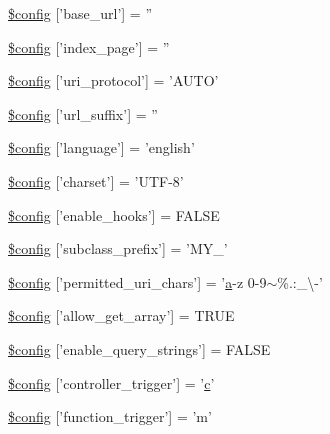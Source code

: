 \begin{DoxyCompactItemize}
\item 
\hyperlink{application_2config_2config_8php_a8063081991a9d7087e6aea78db95a524}{\$config} \mbox{[}'base\-\_\-url'\mbox{]} = ''
\item 
\hyperlink{application_2config_2config_8php_a64d47dc21f6eab24bf747cae9da5e7bb}{\$config} \mbox{[}'index\-\_\-page'\mbox{]} = ''
\item 
\hyperlink{application_2config_2config_8php_a37a0ed82a5db3c3aebdc12611e1e4498}{\$config} \mbox{[}'uri\-\_\-protocol'\mbox{]} = 'A\-U\-T\-O'
\item 
\hyperlink{application_2config_2config_8php_a40da61bb27389d4c21a1271840ec7c40}{\$config} \mbox{[}'url\-\_\-suffix'\mbox{]} = ''
\item 
\hyperlink{application_2config_2config_8php_ae05e29ba794fe4453013dd7b1cc30219}{\$config} \mbox{[}'language'\mbox{]} = 'english'
\item 
\hyperlink{application_2config_2config_8php_ac9128ac0276b1b7acf4c96a22b2469f1}{\$config} \mbox{[}'charset'\mbox{]} = 'U\-T\-F-\/8'
\item 
\hyperlink{application_2config_2config_8php_a2d80c3b160b2bb6f3329a9b07e970c51}{\$config} \mbox{[}'enable\-\_\-hooks'\mbox{]} = F\-A\-L\-S\-E
\item 
\hyperlink{application_2config_2config_8php_a51b79c9e455d64cb54212f2966b28ae6}{\$config} \mbox{[}'subclass\-\_\-prefix'\mbox{]} = 'M\-Y\-\_\-'
\item 
\hyperlink{application_2config_2config_8php_ae2e36375b245287a8851ac04565994de}{\$config} \mbox{[}'permitted\-\_\-uri\-\_\-chars'\mbox{]} = '\hyperlink{bootstrap_8min_8js_a7318f59fb86a4437995ee89c780c51ac}{a}-\/z 0-\/9$\sim$\%.\-:\-\_\-\textbackslash{}-\/'
\item 
\hyperlink{application_2config_2config_8php_ac714a2702b430e47833d82d6ee590298}{\$config} \mbox{[}'allow\-\_\-get\-\_\-array'\mbox{]} = T\-R\-U\-E
\item 
\hyperlink{application_2config_2config_8php_a227b7a6fec0306454ffb0dead1f1c4f7}{\$config} \mbox{[}'enable\-\_\-query\-\_\-strings'\mbox{]} = F\-A\-L\-S\-E
\item 
\hyperlink{application_2config_2config_8php_a7ea9e139536f27af75812de53e852829}{\$config} \mbox{[}'controller\-\_\-trigger'\mbox{]} = '\hyperlink{bootstrap_8min_8js_abce695e0af988ece0826d9ad59b8160d}{c}'
\item 
\hyperlink{application_2config_2config_8php_acac6a7410b2ae72152894e3b93501811}{\$config} \mbox{[}'function\-\_\-trigger'\mbox{]} = 'm'

\end{DoxyCompactItemize}

